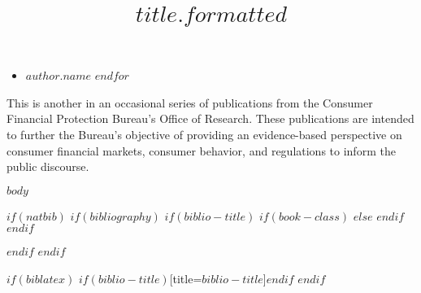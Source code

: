 \documentclass[article$if(classoption)$,$classoption$$endif$]{dp}
\title{$title.formatted$}
\begin{document}
\maketitle
\restoregeometry
{}
\begin{itemize}
  $for(author)$
    \item $author.name$
  $endfor$
\end{itemize}

This is another in an occasional series of publications from the Consumer Financial Protection Bureau's Office of Research. These publications are intended to further the Bureau's objective of providing an evidence-based perspective on consumer financial markets, consumer behavior, and regulations to inform the public discourse.
\newpage


$body$

$if(natbib)$
$if(bibliography)$
$if(biblio-title)$
$if(book-class)$
\renewcommand\bibname{$biblio-title$}
$else$
\renewcommand\refname{$biblio-title$}
$endif$
$endif$

$endif$
$endif$

$if(biblatex)$
\printbibliography$if(biblio-title)$[title=$biblio-title$]$endif$
$endif$
\end{document}
